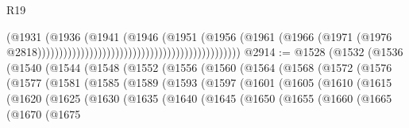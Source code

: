 \begin{lexlean}{R19}
\begin{coremodule}
                                                                              (@1931
                                                                                (@1936
                                                                                  (@1941
                                                                                    (@1946
                                                                                      (@1951
                                                                                        (@1956
                                                                                          (@1961
                                                                                            (@1966
                                                                                              (@1971
                                                                                                (@1976
                                                                                                  @2818)))))))))))))))))))))))))))))))))))))))))))))))
@2914 := @1528
    (@1532
      (@1536
        (@1540
          (@1544
            (@1548
              (@1552
                (@1556
                  (@1560
                    (@1564
                      (@1568
                        (@1572
                          (@1576
                            (@1577
                              (@1581
                                (@1585
                                  (@1589
                                    (@1593
                                      (@1597
                                        (@1601
                                          (@1605
                                            (@1610
                                              (@1615
                                                (@1620
                                                  (@1625
                                                    (@1630
                                                      (@1635
                                                        (@1640
                                                          (@1645
                                                            (@1650
                                                              (@1655
                                                                (@1660
                                                                  (@1665
                                                                    (@1670
                                                                      (@1675

\end{coremodule}
\end{lexlean}
